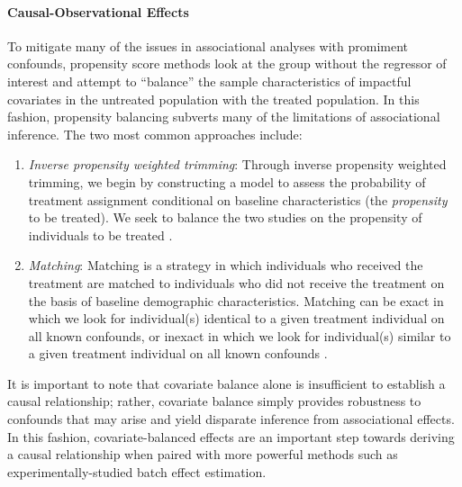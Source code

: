 \paragraph{Causal-Observational Effects} To mitigate many of the issues in associational analyses with promiment confounds, propensity score methods look at the group without the regressor of interest and attempt to ``balance'' the sample characteristics of impactful covariates in the untreated population with the treated population. In this fashion, propensity balancing subverts many of the limitations of associational inference. The two most common approaches include:
\begin{enumerate}
    \item \textit{Inverse propensity weighted trimming}: Through inverse propensity weighted trimming, we begin by constructing a model to assess the probability of treatment assignment conditional on baseline characteristics (the \textit{propensity} to be treated). We seek to balance the two studies on the propensity of individuals to be treated \cite{Stuart2010Feb,Lee2011}.
    \item \textit{Matching}: Matching is a strategy in which individuals who received the treatment are matched to individuals who did not receive the treatment on the basis of baseline demographic characteristics. Matching can be exact in which we look for individual(s) identical to a given treatment individual on all known confounds, or inexact in which we look for individual(s) similar to a given treatment individual on all known confounds \cite{Stuart2010Feb,Rubin1973,Rubin1976,Rubin1976b}.
\end{enumerate}
It is important to note that covariate balance alone is insufficient to establish a causal relationship; rather, covariate balance simply provides robustness to confounds that may arise and yield disparate inference from associational effects. In this fashion, covariate-balanced effects are an important step towards deriving a causal relationship when paired with more powerful methods such as experimentally-studied batch effect estimation.

